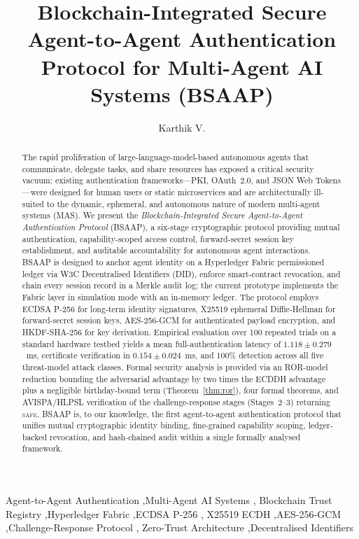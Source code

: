 \documentclass[review,5p,twocolumn,times]{elsarticle}
\begin{document}
\begin{frontmatter}

\title{Blockchain-Integrated Secure Agent-to-Agent Authentication Protocol
       for Multi-Agent AI Systems (BSAAP)}

\author[gim]{Karthik V.}

\address[gim]{Goa Institute of Management, Sanquelim, Goa~403505, India.
  M.Tech AI/ML, SRIP-2026 Big Data Analytics Research Fellow.}

\begin{abstract}
The rapid proliferation of large-language-model-based autonomous agents that
communicate, delegate tasks, and share resources has exposed a critical
security vacuum: existing authentication frameworks---PKI, OAuth~2.0, and
JSON Web Tokens---were designed for human users or static microservices and
are architecturally ill-suited to the dynamic, ephemeral, and autonomous
nature of modern multi-agent systems (MAS). We present the
\emph{Blockchain-Integrated Secure Agent-to-Agent Authentication Protocol}
(BSAAP), a six-stage cryptographic protocol providing mutual authentication,
capability-scoped access control, forward-secret session key establishment,
and auditable accountability for autonomous agent interactions. BSAAP is
designed to anchor agent identity on a Hyperledger Fabric permissioned ledger
via W3C Decentralised Identifiers (DID), enforce smart-contract revocation,
and chain every session record in a Merkle audit log; the current prototype
implements the Fabric layer in simulation mode with an in-memory ledger. The
protocol employs ECDSA P-256 for long-term identity signatures, X25519
ephemeral Diffie-Hellman for forward-secret session keys, AES-256-GCM for
authenticated payload encryption, and HKDF-SHA-256 for key derivation.
Empirical evaluation over 100 repeated trials on a standard hardware testbed
yields a mean full-authentication latency of $1.118 \pm 0.279$~ms,
certificate verification in $0.154 \pm 0.024$~ms, and 100\% detection across
all five threat-model attack classes. Formal security analysis is provided via
an ROR-model reduction bounding the adversarial advantage by two times the
ECDDH advantage plus a negligible birthday-bound term (Theorem~\ref{thm:ror}),
four formal theorems, and AVISPA/HLPSL verification of the challenge-response
stages (Stages~2--3) returning \textsc{safe}. BSAAP is, to our knowledge,
the first agent-to-agent authentication protocol that unifies mutual
cryptographic identity binding, fine-grained capability scoping, ledger-backed
revocation, and hash-chained audit within a single formally analysed framework.
\end{abstract}

\begin{keyword}
Agent-to-Agent Authentication \sep Multi-Agent AI Systems \sep
Blockchain Trust Registry \sep Hyperledger Fabric \sep ECDSA P-256 \sep
X25519 ECDH \sep AES-256-GCM \sep Challenge-Response Protocol \sep
Zero-Trust Architecture \sep Decentralised Identifiers
\end{keyword}

\end{frontmatter}
\end{document}
